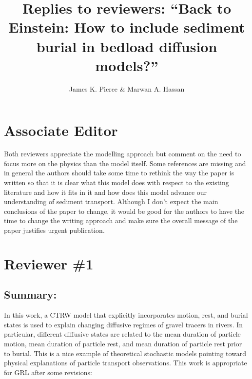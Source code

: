 \documentclass[11pt]{article}
\begin{document}
	
	\title{Replies to reviewers: ``Back to Einstein: How to include sediment burial in bedload diffusion models?''}
	\author{James K. Pierce \& Marwan A. Hassan}
	\maketitle



\section*{Associate Editor}

Both reviewers appreciate the modelling approach but comment on the need to focus more on the physics than the model itself. Some references are missing and in general the authors should take some time to rethink the way the paper is written so that it is clear what this model does with respect to the existing literature and how it fits in it and how does this model advance our understanding of sediment transport. Although I don't expect the main conclusions of the paper to change, it would be good for the authors to have the time to change the writing approach and make sure the overall message of the paper justifies urgent publication.


\section*{Reviewer \#1}
\subsection*{Summary:}
In this work, a CTRW model that explicitly incorporates motion, rest, and burial states is used to explain changing diffusive regimes of gravel tracers in rivers. In particular, different diffusive states are related to the mean duration of particle motion, mean duration of particle rest, and mean duration of particle rest prior to burial. This is a nice example of theoretical stochastic models pointing toward physical explanations of particle transport observations.
This work is appropriate for GRL after some revisions:
\end{document}
